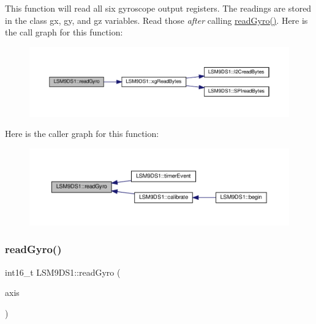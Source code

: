 This function will read all six gyroscope output registers. The readings are stored in the class\textquotesingle{} gx, gy, and gz variables. Read those {\itshape after} calling \hyperlink{classLSM9DS1_a56e9710cb538a4c7f7ab94c2ca256ce9}{read\+Gyro()}. Here is the call graph for this function\+:\nopagebreak
\begin{figure}[H]
\begin{center}
\leavevmode
\includegraphics[width=350pt]{classLSM9DS1_a56e9710cb538a4c7f7ab94c2ca256ce9_cgraph}
\end{center}
\end{figure}
Here is the caller graph for this function\+:\nopagebreak
\begin{figure}[H]
\begin{center}
\leavevmode
\includegraphics[width=350pt]{classLSM9DS1_a56e9710cb538a4c7f7ab94c2ca256ce9_icgraph}
\end{center}
\end{figure}
\mbox{\label{classLSM9DS1_adc1b37609a6c850328b16da4f911cefd}} 
\subsubsection{\texorpdfstring{read\+Gyro()}{readGyro()}\hspace{0.1cm}{\footnotesize\ttfamily [2/2]}}
{\footnotesize\ttfamily int16\+\_\+t L\+S\+M9\+D\+S1\+::read\+Gyro (\begin{DoxyParamCaption}\item[{lsm9ds1\+\_\+axis}]{axis }\end{DoxyParamCaption})}



